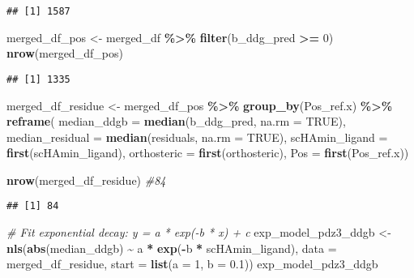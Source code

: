 \documentclass[
]{article}
\newenvironment{Shaded}{\begin{snugshade}}{\end{snugshade}}
\newcommand{\AttributeTok}[1]{\textcolor[rgb]{0.13,0.29,0.53}{#1}}
\newcommand{\CommentTok}[1]{\textcolor[rgb]{0.56,0.35,0.01}{\textit{#1}}}
\newcommand{\ConstantTok}[1]{\textcolor[rgb]{0.56,0.35,0.01}{#1}}
\newcommand{\DecValTok}[1]{\textcolor[rgb]{0.00,0.00,0.81}{#1}}
\newcommand{\FloatTok}[1]{\textcolor[rgb]{0.00,0.00,0.81}{#1}}
\newcommand{\FunctionTok}[1]{\textcolor[rgb]{0.13,0.29,0.53}{\textbf{#1}}}
\newcommand{\NormalTok}[1]{#1}
\newcommand{\OtherTok}[1]{\textcolor[rgb]{0.56,0.35,0.01}{#1}}
\newcommand{\SpecialCharTok}[1]{\textcolor[rgb]{0.81,0.36,0.00}{\textbf{#1}}}
\begin{document}
\begin{verbatim}
## [1] 1587
\end{verbatim}

\begin{Shaded}
\begin{Highlighting}[]
\NormalTok{merged\_df\_pos }\OtherTok{\textless{}{-}}\NormalTok{ merged\_df }\SpecialCharTok{\%\textgreater{}\%} \FunctionTok{filter}\NormalTok{(b\_ddg\_pred }\SpecialCharTok{\textgreater{}=} \DecValTok{0}\NormalTok{)}
\FunctionTok{nrow}\NormalTok{(merged\_df\_pos)}
\end{Highlighting}
\end{Shaded}

\begin{verbatim}
## [1] 1335
\end{verbatim}

\begin{Shaded}
\begin{Highlighting}[]
\NormalTok{merged\_df\_residue }\OtherTok{\textless{}{-}}\NormalTok{ merged\_df\_pos }\SpecialCharTok{\%\textgreater{}\%}
  \FunctionTok{group\_by}\NormalTok{(Pos\_ref.x) }\SpecialCharTok{\%\textgreater{}\%}
  \FunctionTok{reframe}\NormalTok{(}
    \AttributeTok{median\_ddgb =} \FunctionTok{median}\NormalTok{(b\_ddg\_pred, }\AttributeTok{na.rm =} \ConstantTok{TRUE}\NormalTok{),}
    \AttributeTok{median\_residual =} \FunctionTok{median}\NormalTok{(residuals, }\AttributeTok{na.rm =} \ConstantTok{TRUE}\NormalTok{),}
    \AttributeTok{scHAmin\_ligand =} \FunctionTok{first}\NormalTok{(scHAmin\_ligand),}
    \AttributeTok{orthosteric =} \FunctionTok{first}\NormalTok{(orthosteric),}
    \AttributeTok{Pos =} \FunctionTok{first}\NormalTok{(Pos\_ref.x))}

\FunctionTok{nrow}\NormalTok{(merged\_df\_residue) }\CommentTok{\#84}
\end{Highlighting}
\end{Shaded}

\begin{verbatim}
## [1] 84
\end{verbatim}

\begin{Shaded}
\begin{Highlighting}[]
\CommentTok{\# Fit exponential decay: y = a * exp({-}b * x) + c}
\NormalTok{exp\_model\_pdz3\_ddgb }\OtherTok{\textless{}{-}} \FunctionTok{nls}\NormalTok{(}\FunctionTok{abs}\NormalTok{(median\_ddgb) }\SpecialCharTok{\textasciitilde{}}\NormalTok{ a }\SpecialCharTok{*} \FunctionTok{exp}\NormalTok{(}\SpecialCharTok{{-}}\NormalTok{b }\SpecialCharTok{*}\NormalTok{ scHAmin\_ligand),}
                 \AttributeTok{data =}\NormalTok{ merged\_df\_residue,}
                 \AttributeTok{start =} \FunctionTok{list}\NormalTok{(}\AttributeTok{a =} \DecValTok{1}\NormalTok{, }\AttributeTok{b =} \FloatTok{0.1}\NormalTok{))}
\NormalTok{exp\_model\_pdz3\_ddgb}
\end{Highlighting}
\end{Shaded}
\end{document}
